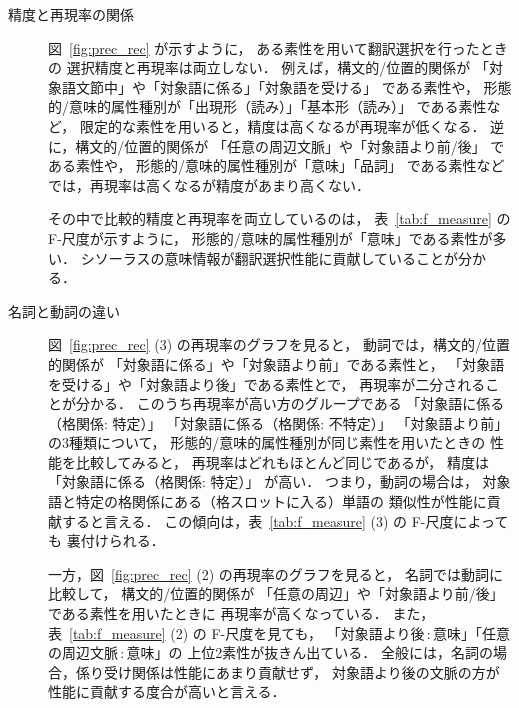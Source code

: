 \begin{description}
 \item[精度と再現率の関係] 図~\ref{fig:prec_rec} が示すように，
	    ある素性を用いて翻訳選択を行ったときの
	    選択精度と再現率は両立しない．
	    例えば，構文的/位置的関係が
	    「対象語文節中」や「対象語に係る」「対象語を受ける」
	    である素性や，
	    形態的/意味的属性種別が「出現形（読み）」「基本形（読み）」
	    である素性など，
	    限定的な素性を用いると，精度は高くなるが再現率が低くなる．
	    逆に，構文的/位置的関係が
	    「任意の周辺文脈」や「対象語より前/後」
	    である素性や，
	    形態的/意味的属性種別が「意味」「品詞」
	    である素性などでは，再現率は高くなるが精度があまり高くない．

	    その中で比較的精度と再現率を両立しているのは，
	    表~\ref{tab:f_measure} の F-尺度が示すように，
	    形態的/意味的属性種別が「意味」である素性が多い．
	    シソーラスの意味情報が翻訳選択性能に貢献していることが分かる．
 \item[名詞と動詞の違い] 図~\ref{fig:prec_rec} (3)
	    の再現率のグラフを見ると，
	    動詞では，構文的/位置的関係が
	    「対象語に係る」や「対象語より前」である素性と，
	    「対象語を受ける」や「対象語より後」である素性とで，
	    再現率が二分されることが分かる．
	    このうち再現率が高い方のグループである
	    「対象語に係る（格関係: 特定）」
	    「対象語に係る（格関係: 不特定）」
	    「対象語より前」
	    の3種類について，
	    形態的/意味的属性種別が同じ素性を用いたときの
	    性能を比較してみると，
	    再現率はどれもほとんど同じであるが，
	    精度は
	    「対象語に係る（格関係: 特定）」
	    が高い．
	    つまり，動詞の場合は，
	    対象語と特定の格関係にある（格スロットに入る）単語の
	    類似性が性能に貢献すると言える．
	    この傾向は，表~\ref{tab:f_measure} (3) の F-尺度によっても
	    裏付けられる．

	    一方，図~\ref{fig:prec_rec} (2)
	    の再現率のグラフを見ると，
	    名詞では動詞に比較して，
	    構文的/位置的関係が
	    「任意の周辺」や「対象語より前/後」である素性を用いたときに
	    再現率が高くなっている．
	    また，表~\ref{tab:f_measure} (2) の F-尺度を見ても，
	    「対象語より後\,:\,意味」「任意の周辺文脈\,:\,意味」の
	    上位2素性が抜きん出ている．
	    全般には，名詞の場合，係り受け関係は性能にあまり貢献せず，
	    対象語より後の文脈の方が性能に貢献する度合が高いと言える．
\end{description}

